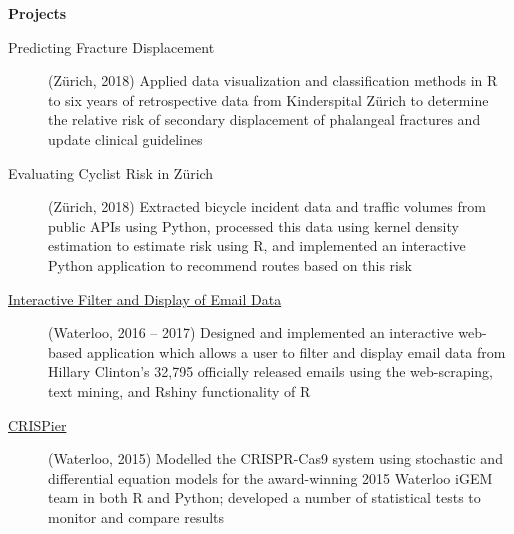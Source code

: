 \documentclass[letterpaper,11pt]{article}
\newcommand{\resheading}[1]{\colorbox{resBlue}{\begin{minipage}{\textwidth}
			\textbf{#1}
\end{minipage}} \vspace{-14pt}}
\begin{document}
\resheading{Projects}
\begin{description}\item[Predicting Fracture Displacement] (Z\"urich, 2018) {\footnotesize Applied data visualization and classification methods in R to six years of retrospective data from Kinderspital Z\"urich to determine the relative risk of secondary displacement of phalangeal fractures and update clinical guidelines}
	\item[Evaluating Cyclist Risk in Z\"urich] (Z\"urich, 2018) {\footnotesize Extracted bicycle incident data and traffic volumes from public APIs using Python, processed this data using kernel density estimation to estimate risk using R, and implemented an interactive Python application to recommend routes based on this risk}
	\item[\href{https://shiny.math.uwaterloo.ca/sas/clinton/}{Interactive Filter and Display of Email Data}] (Waterloo, 2016 -- 2017) {\footnotesize Designed and implemented an interactive web-based application which allows a user to filter and display email data from Hillary Clinton's 32,795 officially released emails using the web-scraping, text mining, and Rshiny functionality of R}
	\item[\href{http://2015.igem.org/Team:Waterloo}{CRISPier}] (Waterloo, 2015) {\footnotesize Modelled the CRISPR-Cas9 system using stochastic and differential equation models for the award-winning 2015 Waterloo iGEM team in both R and Python; developed a number of statistical tests to monitor and compare results}
\end{description}
\end{document}
